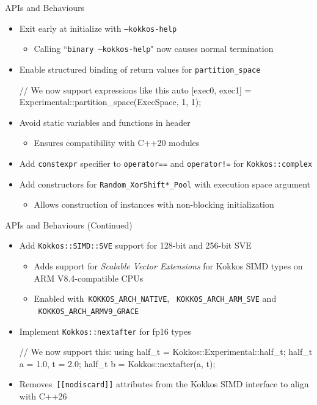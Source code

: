 \begin{frame}[fragile]{APIs and Behaviours}
 \begin{itemize}
   \item Exit early at initialize with \texttt{--kokkos-help}
    \begin{itemize}
      \item Calling ``\texttt{binary --kokkos-help}" now causes normal termination
   \end{itemize}  
   \item Enable structured binding of return values for \texttt{partition\_space}
        \begin{code}[keywords={std}]
          // We now support expressions like this
          auto [exec0, exec1] = 
                  Experimental::partition_space(ExecSpace, 1, 1);
        \end{code}
    \item Avoid static variables and functions in header
    \begin{itemize}
      \item  Ensures compatibility with C++20 modules
      \end{itemize}
    \item Add \texttt{constexpr} specifier to \texttt{operator==} and \texttt{operator!=} for \texttt{Kokkos::complex}
    \item Add constructors for \texttt{Random\_XorShift*\_Pool} with execution space argument
      \begin{itemize}
      \item Allows construction of instances with non-blocking initialization
    \end{itemize}

 \end{itemize}
\end{frame}

\begin{frame}[fragile]{APIs and Behaviours (Continued)}
 \begin{itemize}
     \item Add \texttt{Kokkos::SIMD::SVE} support for 128-bit and 256-bit SVE 
     \begin{itemize}
      \item Adds support for \emph{Scalable Vector Extensions} for Kokkos SIMD types on ARM V8.4-compatible CPUs
      \item Enabled with~\texttt{KOKKOS\_ARCH\_NATIVE}, ~\texttt{KOKKOS\_ARCH\_ARM\_SVE} and
 ~\texttt{KOKKOS\_ARCH\_ARMV9\_GRACE}
     \end{itemize}
     \item Implement \texttt{Kokkos::nextafter} for fp16 types
        \begin{code}[keywords={std}]
          // We now support this:
          using half_t = Kokkos::Experimental::half_t;
          half_t a = 1.0, t = 2.0;
          half_t b = Kokkos::nextafter(a, t);
        \end{code}
        \item Removes~\texttt{[[nodiscard]]} attributes from the Kokkos SIMD interface to align with C++26
 \end{itemize}
\end{frame}


